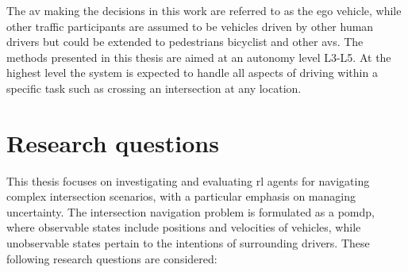 
The \gls{av} making the decisions in this work are referred to as the ego vehicle, while other traffic participants are assumed to be vehicles driven by other human drivers but could be extended to pedestrians bicyclist and other \gls{av}s. 
The methods presented in this thesis are aimed at an autonomy level L3-L5. At the highest level the system is expected to handle all aspects of driving within a specific task such as crossing an intersection at any location. 



\section{Research questions}
\label{sec:research_questions}


	

This thesis focuses on investigating and evaluating \gls{rl} agents for navigating complex intersection scenarios, with a particular emphasis on managing uncertainty. 
The intersection navigation problem is formulated as a \gls{pomdp}, where observable states include positions and velocities of vehicles, while unobservable states pertain to the intentions of surrounding drivers. These following research questions are considered:

